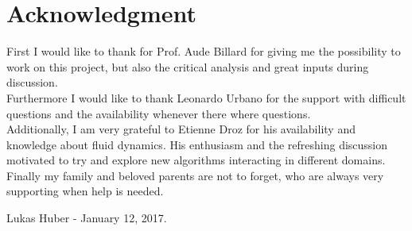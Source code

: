 \chapter*{Acknowledgment}
First I would like to thank for Prof. Aude Billard for giving me the possibility to work on this project, but also the critical analysis and great inputs during discussion. \\
Furthermore I would like to thank Leonardo Urbano for the support with difficult questions and the availability whenever there where questions. \\
Additionally, I am very grateful to Etienne Droz for his availability and knowledge about fluid dynamics. His enthusiasm and the refreshing discussion motivated to try and explore new algorithms interacting in different domains. \\
Finally my family and beloved parents are not to forget, who are always very supporting when help is needed.

Lukas Huber - January 12, 2017.